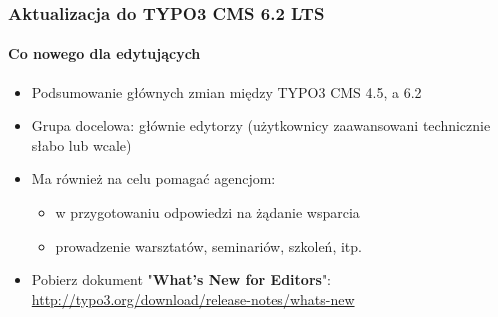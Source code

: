 \begin{frame}[fragile]
	\frametitle{Aktualizacja do TYPO3 CMS 6.2 LTS}
	\framesubtitle{Co nowego dla edytujących}

	\begin{itemize}
		\item Podsumowanie głównych zmian między TYPO3 CMS 4.5, a 6.2
		\item Grupa docelowa: głównie edytorzy (użytkownicy zaawansowani technicznie słabo lub wcale)
		\item Ma również na celu pomagać agencjom:

			\begin{itemize}
				\item w przygotowaniu odpowiedzi na żądanie wsparcia
				\item prowadzenie warsztatów, seminariów, szkoleń, itp.
			\end{itemize}

		\item Pobierz dokument "\textbf{What's New for Editors}":\newline
			\smaller\url{http://typo3.org/download/release-notes/whats-new}\normalsize

	\end{itemize}

\end{frame}


